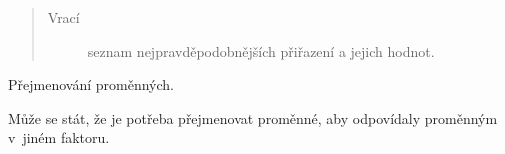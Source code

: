 \begin{fulllineitems}
\begin{fulllineitems}
\begin{quote}
\begin{description}
\item[{Vrací}] \leavevmode
seznam nejpravděpodobnějších přiřazení a jejich hodnot.

\end{description}\end{quote}

\end{fulllineitems}


\begin{fulllineitems}
\label{alex.infer:alex.infer.factor.Factor.rename_variables}
Přejmenování proměnných.

Může se stát, že je potřeba přejmenovat proměnné, aby odpovídaly proměnným v~jiném faktoru.


\end{fulllineitems}
\end{fulllineitems}
